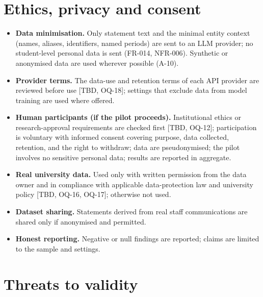 \documentclass[
  11pt,a4paper,oneside]{report}
\providecommand{\tightlist}{%
  \setlength{\itemsep}{0pt}\setlength{\parskip}{0pt}}
\begin{document}
\hypertarget{ethics-privacy-and-consent}{%
\section{Ethics, privacy and consent}\label{ethics-privacy-and-consent}}

\begin{itemize}
\tightlist
\item
  \textbf{Data minimisation.} Only statement text and the minimal entity
  context (names, aliases, identifiers, named periods) are sent to an
  LLM provider; no student-level personal data is sent (FR-014,
  NFR-006). Synthetic or anonymised data are used wherever possible
  (A-10).
\item
  \textbf{Provider terms.} The data-use and retention terms of each API
  provider are reviewed before use {[}TBD, OQ-18{]}; settings that
  exclude data from model training are used where offered.
\item
  \textbf{Human participants (if the pilot proceeds).} Institutional
  ethics or research-approval requirements are checked first {[}TBD,
  OQ-12{]}; participation is voluntary with informed consent covering
  purpose, data collected, retention, and the right to withdraw; data
  are pseudonymised; the pilot involves no sensitive personal data;
  results are reported in aggregate.
\item
  \textbf{Real university data.} Used only with written permission from
  the data owner and in compliance with applicable data-protection law
  and university policy {[}TBD, OQ-16, OQ-17{]}; otherwise not used.
\item
  \textbf{Dataset sharing.} Statements derived from real staff
  communications are shared only if anonymised and permitted.
\item
  \textbf{Honest reporting.} Negative or null findings are reported;
  claims are limited to the sample and settings.
\end{itemize}

\hypertarget{threats-to-validity}{%
\section{Threats to validity}\label{threats-to-validity}}
\end{document}
